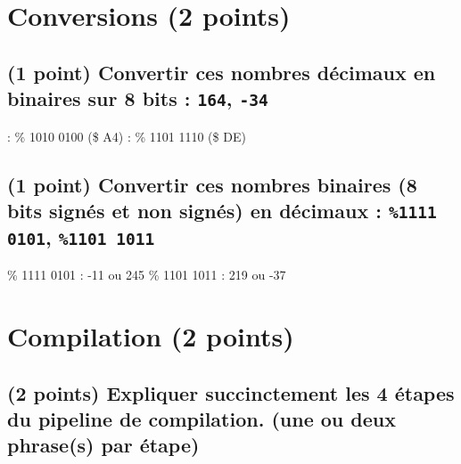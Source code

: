 \documentclass[11pt,a4paper]{article}
\author{Fabrice BOISSIER}
\begin{document}
\setlength{\fboxrule}{2pt}

\noindent {}



%


\section{Conversions (2 points)} %

\subsection{(1 point) Convertir ces nombres décimaux en binaires sur 8 bits : \texttt{164}, \texttt{-34}}

 : \% 1010 0100 (\$ A4)	 : \% 1101 1110 (\$ DE)
\bigskip

\subsection{(1 point) Convertir ces nombres binaires (8 bits signés et non signés) en décimaux : \texttt{\%1111 0101}, \texttt{\%1101 1011}}

\bigskip
\% 1111 0101 : -11 ou 245	\qquad	\% 1101 1011 : 219 ou -37
\bigskip

\section{Compilation (2 points)} %

\subsection{(2 points) Expliquer succinctement les 4 étapes du pipeline de compilation. (une ou deux phrase(s) par étape)}
\end{document}
